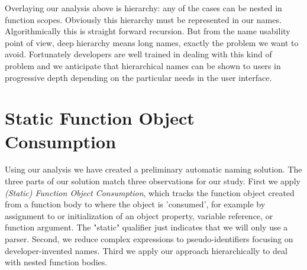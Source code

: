 \documentclass[10pt, preprint]{sigplanconf}
\begin{document}
{Overlaying our analysis above is hierarchy: any of the cases can be nested in function scopes. Obviously this hierarchy must be represented in our names. Algorithmically this is straight forward recursion. But from the name usability point of view, deep hierarchy means long names, exactly the problem we want to avoid. Fortunately developers are well trained in dealing with this kind of problem and we anticipate  that hierarchical names can be shown to users in progressive depth depending on the particular needs in the user interface.



\section{Static  Function Object Consumption}
Using our analysis we have created a preliminary automatic naming solution.  The three parts of our solution match three observations for our study. First we apply 
 \textit{(Static) Function Object Consumption}, which tracks the function object created from a function body to where the object is 'consumed', for example by assignment to or initialization of  an object property, variable reference, or function argument. The "static" qualifier just indicates that we will only use a parser.  Second, we reduce complex expressions to pseudo-identifiers focusing on developer-invented names.  Third we apply our approach hierarchically to  deal with nested function bodies.

}
\end{document}
